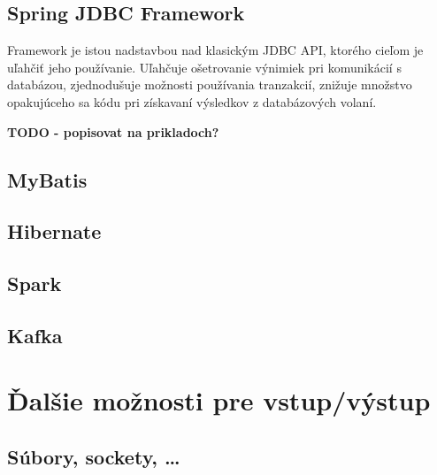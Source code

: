 \section{Spring JDBC Framework}

\citet{SpringJDBC} Framework je istou nadstavbou nad klasickým JDBC API, ktorého cieľom je uľahčiť jeho používanie.
Uľahčuje ošetrovanie výnimiek pri komunikácií s databázou, zjednodušuje možnosti používania tranzakcií,
znižuje množstvo opakujúceho sa kódu pri získavaní výsledkov z databázových volaní.

\textbf{TODO - popisovat na prikladoch?}

\section{MyBatis}

\citet{MyBatis}

\section{Hibernate}

\section{Spark}

\section{Kafka}


\chapter{Ďalšie možnosti pre vstup/výstup}

\section{Súbory, sockety, \dots}

